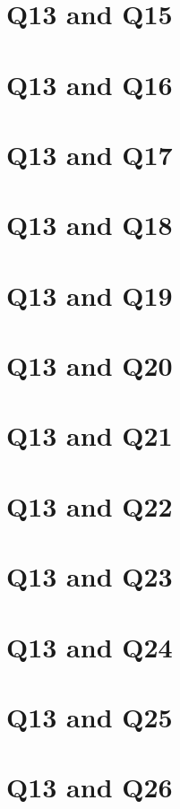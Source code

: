 \documentclass{report}
\begin{document}
\section{Q13 and Q15}\clearpage
\section{Q13 and Q16}\clearpage
\section{Q13 and Q17}\clearpage
\section{Q13 and Q18}\clearpage
\section{Q13 and Q19}\clearpage
\section{Q13 and Q20}\clearpage
\section{Q13 and Q21}\clearpage
\section{Q13 and Q22}\clearpage
\section{Q13 and Q23}\clearpage
\section{Q13 and Q24}\clearpage
\section{Q13 and Q25}\clearpage
\section{Q13 and Q26}\clearpage
\end{document}
